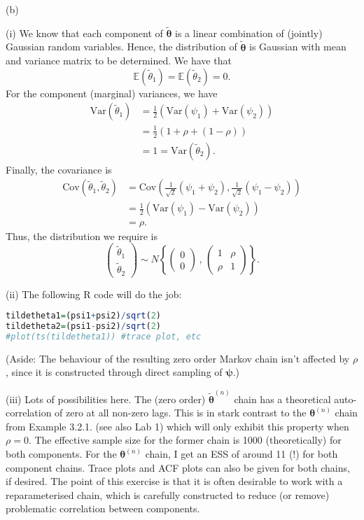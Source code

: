 \documentclass[12pt,BCOR2mm,DIV14,english]{scrreprt}
\theoremstyle{exmp}
\newcommand{\bmtheta}{\boldsymbol{\theta}}
\newcommand{\bmpsi}{\boldsymbol{\psi}}
\newcommand{\E}{\mathbb{E}}
\newcommand{\V}{\mathrm{Var}}
\begin{document}
\begin{enumerate}
(b) 

(i) We know that each component of $\tilde{\bmtheta}$ is a linear combination of (jointly) 
Gaussian random variables. Hence, the distribution of $\tilde{\bmtheta}$ is Gaussian with mean 
and variance matrix to be determined. We have that
\[
\E(\tilde{\theta}_1)=\E(\tilde{\theta}_2)=0.
\]
For the component (marginal) variances, we have
\begin{align*}
\V(\tilde{\theta}_1)&=\frac{1}{2}(\V(\psi_1)+\V(\psi_2))\\
&=\frac{1}{2}(1+\rho+(1-\rho))\\
&=1 = \V(\tilde{\theta}_2).
\end{align*}
Finally, the covariance is
\begin{align*}
\textrm{Cov}(\tilde{\theta}_1,\tilde{\theta}_2)&= \textrm{Cov}\left(\frac{1}{\sqrt{2}}(\psi_1+\psi_2),\frac{1}{\sqrt{2}}(\psi_1-\psi_2)\right)\\
&=\frac{1}{2} (\V(\psi_1)-\V(\psi_2))\\
&=\rho.
\end{align*}
Thus, the distribution we require is
\[
\begin{pmatrix} \tilde{\theta}_1 \\ \tilde{\theta}_2 \end{pmatrix} \sim 
N\left\{\begin{pmatrix} 0 \\ 0 \end{pmatrix}\,,\, \begin{pmatrix} 1 & \rho\\ \rho & 1 \end{pmatrix}   \right\}.
\]

(ii) The following R code will do the job:

\begin{lstlisting}[language=R]
tildetheta1=(psi1+psi2)/sqrt(2)
tildetheta2=(psi1-psi2)/sqrt(2)
#plot(ts(tildetheta1)) #trace plot, etc
\end{lstlisting}

(Aside: The behaviour of the resulting zero order Markov chain isn't affected by $\rho$, since it is constructed through direct sampling 
of $\bmpsi$.)  

(iii) Lots of possibilities here. The (zero order) $\tilde{\bmtheta}^{(n)}$ chain has a theoretical auto-correlation of zero at all non-zero lags. This is in stark 
contrast to the $\bmtheta^{(n)}$ chain from Example 3.2.1. (see also Lab 1) which will only exhibit this property when $\rho=0$. The effective sample size for the former chain is 1000 (theoretically) for both components. For the $\bmtheta^{(n)}$ chain, I get an ESS of around 11 (!) for both component chains. Trace plots and ACF plots can also be given for both chains, if desired. The point of this exercise 
is that it is often desirable to work with a reparameterised chain, which is carefully constructed to reduce (or remove) problematic 
correlation between components.    



\end{enumerate}
\end{document}
